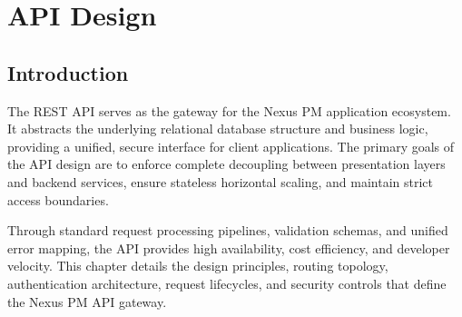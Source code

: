 \chapter{API Design}
\label{chap:api-design}

\section{Introduction}
The REST API serves as the gateway for the Nexus PM application ecosystem. It abstracts the underlying relational database structure and business logic, providing a unified, secure interface for client applications. The primary goals of the API design are to enforce complete decoupling between presentation layers and backend services, ensure stateless horizontal scaling, and maintain strict access boundaries.

Through standard request processing pipelines, validation schemas, and unified error mapping, the API provides high availability, cost efficiency, and developer velocity. This chapter details the design principles, routing topology, authentication architecture, request lifecycles, and security controls that define the Nexus PM API gateway.

